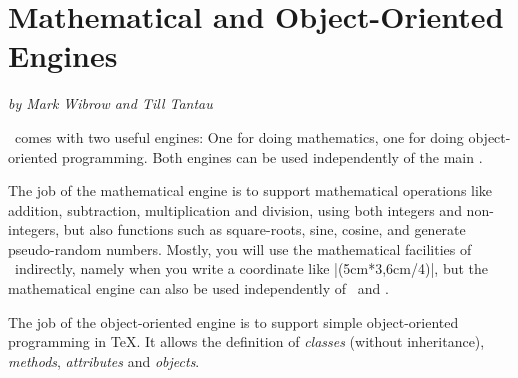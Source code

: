 \vskip2cm
\medskip
\noindent
\begin{codeexample}[graphic=white]
\end{codeexample}









\part{Mathematical and Object-Oriented Engines}

{\Large \emph{by Mark Wibrow and Till Tantau}}


\bigskip
\noindent
\pgfname\ comes with two useful engines: One for doing mathematics,
one for doing object-oriented programming. Both engines can be used
independently of the main \pgfname.

The job of the mathematical
engine is to support mathematical operations like addition,
subtraction, multiplication and division, using both integers and
non-integers, but also functions such as square-roots, sine, cosine,
and generate pseudo-random numbers.
Mostly, you will use the mathematical facilities of \pgfname\
indirectly, namely when you write a coordinate like |(5cm*3,6cm/4)|,
but the mathematical engine can also be used independently of
\pgfname\ and \tikzname.

The job of the object-oriented engine is to support simple
object-oriented programming in \TeX. It allows the definition of
\emph{classes} (without inheritance), \emph{methods},
\emph{attributes} and \emph{objects}.

